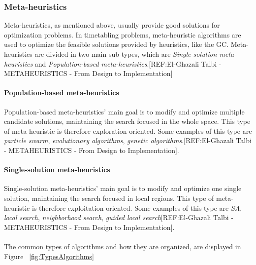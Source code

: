 \subsubsection{Meta-heuristics}
Meta-heuristics, as mentioned above, usually provide good solutions for optimization problems. In timetabling problems, meta-heuristic algorithms are used to optimize the feasible solutions provided by heuristics, like the GC. Meta-heuristics are divided in two main sub-types, which are \textit{Single-solution meta-heuristics} and \textit{Population-based meta-heuristics}.[REF:El-Ghazali Talbi - METAHEURISTICS - From Design to Implementation]\\

\paragraph{Population-based meta-heuristics}
Population-based meta-heuristics' main goal is to modify and optimize multiple candidate solutions, maintaining the search focused in the whole space. This type of meta-heuristic is therefore exploration oriented. Some examples of this type are \textit{particle swarm}, \textit{evolutionary algorithms}, \textit{genetic algorithms}.[REF:El-Ghazali Talbi - METAHEURISTICS - From Design to Implementation].\\

\paragraph{Single-solution meta-heuristics}
Single-solution meta-heuristics' main goal is to modify and optimize one single solution, maintaining the search focused in local regions. This type of meta-heuristic is therefore exploitation oriented. Some examples of this type are \textit{SA}, \textit{local search}, \textit{neighborhood search}, \textit{guided local search}[REF:El-Ghazali Talbi - METAHEURISTICS - From Design to Implementation]. \\
\\
The common types of algorithms and how they are organized, are displayed in Figure ~\ref{fig:TypesAlgorithms}

